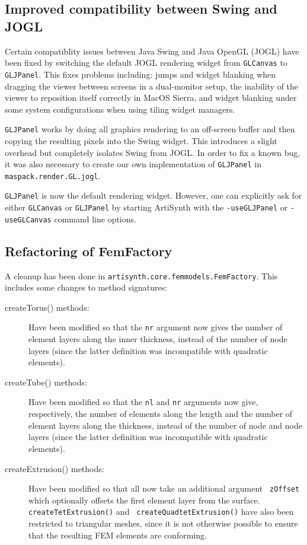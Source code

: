 \documentclass{article}
\begin{document}
\subsection*{Improved compatibility between Swing and JOGL}

Certain compatiblity issues between Java Swing and Java OpenGL (JOGL)
have been fixed by switching the default JOGL rendering widget from
{\tt GLCanvas} to {\tt GLJPanel}. This fixes problems including: jumps
and widget blanking when dragging the viewer between screens in a
dual-monitor setup, the inability of the viewer to reposition itself
correctly in MacOS Sierra, and widget blanking under some system
configurations when using tiling widget managers.

{\tt GLJPanel} works by doing all graphics rendering to an off-screen
buffer and then copying the resulting pixels into the Swing widget.
This introduces a slight overhead but completely isolates Swing from
JOGL. In order to fix a known bug, it was also necessary to create our
own implementation of {\tt GLJPanel} in {\tt maspack.render.GL.jogl}.

{\tt GLJPanel} is now the default rendering widget. However, one can
explicitly ask for either {\tt GLCanvas} or {\tt GLJPanel} by starting
ArtiSynth with the {\tt -useGLJPanel} or {\tt -useGLCanvas} command
line options.

\subsection*{Refactoring of FemFactory}

A cleanup has been done in {\tt artisynth.core.femmodels.FemFactory}.
This includes some changes to method signatures:

\begin{description}

\item[createTorus() methods:]\mbox{}

Have been modified so that the {\tt nr} argument now gives the
number of element layers along the inner thickness, instead of the
number of node layers (since the latter definition was incompatible
with quadratic elements).

\item[createTube() methods:]\mbox{}

Have been modified so that the {\tt nl} and {\tt nr} arguments now
give, respectively, the number of elements along the length and the
number of element layers along the thickness, instead of the number of
node and node layers (since the latter definition was incompatible
with quadratic elements).

\item[createExtrusion() methods:]\mbox{}

Have been modified so that all now take an additional argument {\tt
zOffset} which optionally offsets the first element layer from the
surface.  {\tt createTetExtrusion()} and {\tt
createQuadtetExtrusion()} have also been restricted to triangular
meshes, since it is not otherwise possible to ensure that the
resulting FEM elements are conforming.

\end{description}
\end{document}
